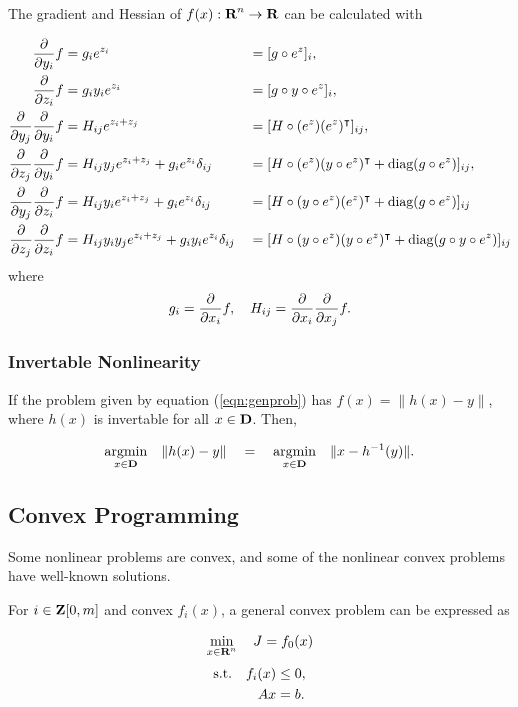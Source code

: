\documentclass{article}
\begin{document}
The gradient and Hessian of $f(x):\textbf{R}^n\to\textbf{R}$ can be calculated with

\begin{align*}
    \frac{\partial }{\partial y_i}f&=g_i e^{z_i}&&=[g\circ e^z]_i, 
    \\
    \frac{\partial }{\partial z_i}f&=g_iy_ie^{z_i}&&=[g\circ y\circ e^z]_i,
    \\
    \frac{\partial }{\partial y_j}\frac{\partial }{\partial y_i} f&= H_{ij}e^{z_i+z_j}&&= [H\circ (e^z)(e^z)^\intercal]_{ij},
    \\
    \frac{\partial }{\partial z_j}\frac{\partial }{\partial y_i} f&=  
    H_{ij}y_je^{z_i+z_j} + g_ie^{z_i}\delta_{ij}&&= [H\circ (e^z)(y\circ e^z)^\intercal+\text{diag}(g\circ e^z)]_{ij},
    \\
    \frac{\partial }{\partial y_j}\frac{\partial }{\partial z_i} f&= H_{ij}y_ie^{z_i+z_j}+g_ie^{z_i}\delta_{ij}&&= [H\circ (y\circ e^z)(e^z)^\intercal+\text{diag}(g\circ e^z)]_{ij}
    \\
    \frac{\partial }{\partial z_j}\frac{\partial }{\partial z_i} f&= H_{ij}y_iy_je^{z_i+z_j}+g_iy_ie^{z_i}\delta_{ij}
    &&
    =[H\circ (y\circ e^z)(y\circ e^z)^\intercal+\text{diag}(g\circ y\circ e^z)]_{ij}
\end{align*}
where
\begin{align*}
    g_i=\frac{\partial }{\partial x_i}f,\quad
    H_{ij}=\frac{\partial }{\partial x_i}\frac{\partial }{\partial x_j}f.
\end{align*}

\subsubsection{Invertable Nonlinearity}

    If the problem given by equation (\ref{eqn:genprob}) has $f(x)=\|h(x)-y\|$, where $h(x)$ is invertable for all $x\in\textbf{D}$. Then,
    
    \begin{align}
        \underset{x\in\textbf{D}}{\mathrm{argmin}}\quad \|h(x)-y\|\quad=\quad \underset{x\in\textbf{D}}{\mathrm{argmin}}\quad\|x-h^{-1}(y)\|.
    \end{align}


\subsection{Convex Programming}

Some nonlinear problems are convex, 
and some of the nonlinear convex problems have well-known solutions.

For $i\in\textbf{Z}[0,m]$ and convex $f_i(x)$, a general convex problem can be expressed as

\begin{align}
    \min_{x\in\textbf{R}^n}\quad J = f_0(x)
\end{align}
\begin{align*}
    \text{s.t.} \quad f_i(x)&\leq 0,\\
    A x&=b.
\end{align*}
\end{document}

